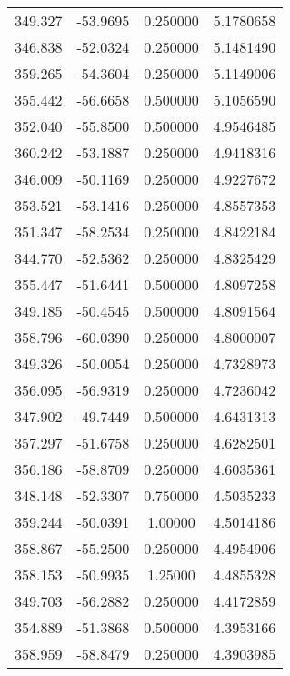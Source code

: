\documentclass{article}
\begin{document}
\begin{tabular}{| c | c | c | c |}
      349.327 &      -53.9695 &      0.250000 &        5.1780658\\
      346.838 &      -52.0324 &      0.250000 &        5.1481490\\
      359.265 &      -54.3604 &      0.250000 &        5.1149006\\
      355.442 &      -56.6658 &      0.500000 &        5.1056590\\
      352.040 &      -55.8500 &      0.500000 &        4.9546485\\
      360.242 &      -53.1887 &      0.250000 &        4.9418316\\
      346.009 &      -50.1169 &      0.250000 &        4.9227672\\
      353.521 &      -53.1416 &      0.250000 &        4.8557353\\
      351.347 &      -58.2534 &      0.250000 &        4.8422184\\
      344.770 &      -52.5362 &      0.250000 &        4.8325429\\
      355.447 &      -51.6441 &      0.500000 &        4.8097258\\
      349.185 &      -50.4545 &      0.500000 &        4.8091564\\
      358.796 &      -60.0390 &      0.250000 &        4.8000007\\
      349.326 &      -50.0054 &      0.250000 &        4.7328973\\
      356.095 &      -56.9319 &      0.250000 &        4.7236042\\
      347.902 &      -49.7449 &      0.500000 &        4.6431313\\
      357.297 &      -51.6758 &      0.250000 &        4.6282501\\
      356.186 &      -58.8709 &      0.250000 &        4.6035361\\
      348.148 &      -52.3307 &      0.750000 &        4.5035233\\
      359.244 &      -50.0391 &       1.00000 &        4.5014186\\
      358.867 &      -55.2500 &      0.250000 &        4.4954906\\
      358.153 &      -50.9935 &       1.25000 &        4.4855328\\
      349.703 &      -56.2882 &      0.250000 &        4.4172859\\
      354.889 &      -51.3868 &      0.500000 &        4.3953166\\
      358.959 &      -58.8479 &      0.250000 &        4.3903985\\

\end{tabular}
\end{document}
